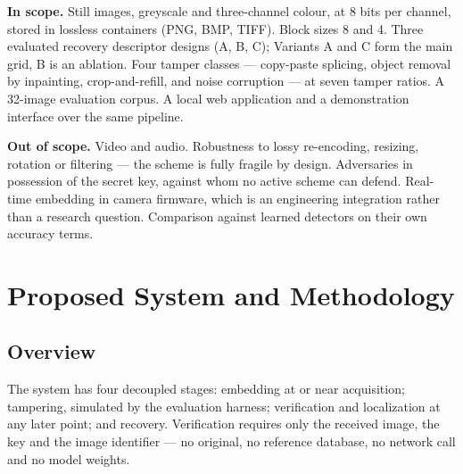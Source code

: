 \documentclass[12pt,a4paper]{article}
\begin{document}
\textbf{In scope.} Still images, greyscale and three-channel colour, at 8 bits per
channel, stored in lossless containers (PNG, BMP, TIFF). Block sizes 8 and 4.
Three evaluated recovery descriptor designs (A, B, C); Variants A and C form
the main grid, B is an ablation. Four tamper classes --- copy-paste splicing,
object removal by inpainting, crop-and-refill, and noise corruption --- at
seven tamper ratios. A 32-image evaluation corpus. A local web application and
a demonstration interface over the same pipeline.

\textbf{Out of scope.} Video and audio. Robustness to lossy re-encoding,
resizing, rotation or filtering --- the scheme is fully fragile by design.
Adversaries in possession of the secret key, against whom no active scheme can
defend. Real-time embedding in camera firmware, which is an engineering
integration rather than a research question. Comparison against learned detectors
on their own accuracy terms.

\section{Proposed System and Methodology}

\subsection{Overview}

The system has four decoupled stages: embedding at or near acquisition;
tampering, simulated by the evaluation harness; verification and localization
at any later point; and recovery. Verification requires only the received
image, the key and the image identifier --- no original, no reference
database, no network call and no model weights.
\end{document}
